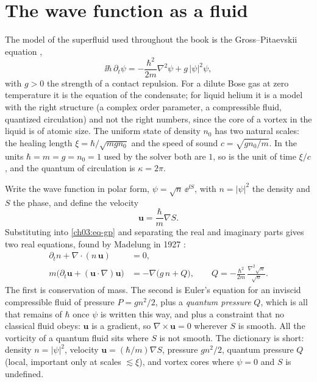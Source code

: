 \section{The wave function as a fluid}\label{ch03:madelung}

The model of the superfluid used throughout the book is the Gross--Pitaevskii equation \cite{Gross1961,Pitaevskii1961},
\begin{equation}\label{ch03:eq-gp}
  \ii\hbar\,\partial_t\psi=-\frac{\hbar^2}{2m}\nabla^2\psi+g\,|\psi|^2\psi,
\end{equation}
with $g>0$ the strength of a contact repulsion. For a dilute Bose gas at zero temperature it is the equation of the condensate; for liquid helium it is a model with the right structure (a complex order parameter, a compressible fluid, quantized circulation) and not the right numbers, since the core of a vortex in the liquid is of atomic size. The uniform state of density $n_0$ has two natural scales: the healing length $\xi=\hbar/\sqrt{mgn_0}$ and the speed of sound $c=\sqrt{gn_0/m}$. In the units $\hbar=m=g=n_0=1$ used by the solver both are $1$, so is the unit of time $\xi/c$, and the quantum of circulation is $\kappa=2\pi$.

Write the wave function in polar form, $\psi=\sqrt n\,\ee^{\ii S}$, with $n=|\psi|^2$ the density and $S$ the phase, and define the velocity
\begin{equation}\label{ch03:eq-u}
  \mathbf u=\frac{\hbar}{m}\nabla S .
\end{equation}
Substituting into \eqref{ch03:eq-gp} and separating the real and imaginary parts gives two real equations, found by Madelung in 1927 \cite{Madelung1927}:
\begin{align}
  \partial_t n+\nabla\!\cdot(n\,\mathbf u)&=0, \label{ch03:eq-cont}\\
  m\big(\partial_t\mathbf u+(\mathbf u\!\cdot\!\nabla)\mathbf u\big)&=-\nabla\big(g\,n+Q\big),\qquad Q=-\frac{\hbar^2}{2m}\,\frac{\nabla^2\sqrt n}{\sqrt n}. \label{ch03:eq-euler}
\end{align}
The first is conservation of mass. The second is Euler's equation for an inviscid compressible fluid of pressure $P=gn^2/2$, plus a \emph{quantum pressure} $Q$, which is all that remains of $\hbar$ once $\psi$ is written this way, and plus a constraint that no classical fluid obeys: $\mathbf u$ is a gradient, so $\nabla\times\mathbf u=0$ wherever $S$ is smooth. All the vorticity of a quantum fluid sits where $S$ is not smooth. The dictionary is short: density $n=|\psi|^2$, velocity $\mathbf u=(\hbar/m)\nabla S$, pressure $gn^2/2$, quantum pressure $Q$ (local, important only at scales $\lesssim\xi$), and vortex cores where $\psi=0$ and $S$ is undefined.

